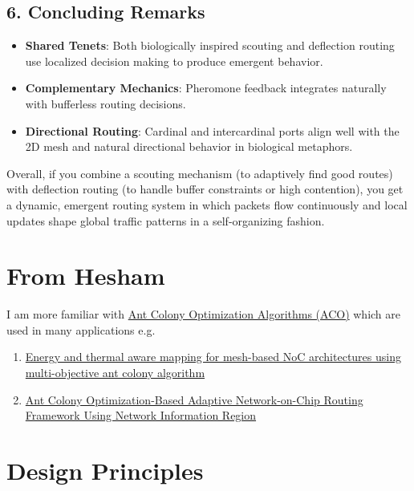 \documentclass[../OAE-SPEC-MAIN.tex]{subfiles}
\begin{document}
\subsection*{6. Concluding Remarks}

\begin{itemize}
    \item \textbf{Shared Tenets}: Both biologically inspired scouting and deflection routing use localized decision making to produce emergent behavior.
    \item \textbf{Complementary Mechanics}: Pheromone feedback integrates naturally with bufferless routing decisions.
    \item \textbf{Directional Routing}: Cardinal and intercardinal ports align well with the 2D mesh and natural directional behavior in biological metaphors.
\end{itemize}


Overall, if you combine a scouting mechanism (to adaptively find good routes) with deflection routing (to handle buffer constraints or high contention), you get a dynamic, emergent routing system in which packets flow continuously and local updates shape global traffic patterns in a self-organizing fashion.

\section{From Hesham}

I am more familiar with \href{https://ieeexplore.ieee.org/abstract/document/5764225}{Ant Colony Optimization Algorithms (ACO)} which are used in many applications e.g. 

\begin{enumerate}
\item  \href{https://ieeexplore.ieee.org/document/6945251}{Energy and thermal aware mapping for mesh-based NoC architectures using multi-objective ant colony algorithm}

\item  \href{ (https://ieeexplore.ieee.org/document/6945251)}{ Ant Colony Optimization-Based Adaptive Network-on-Chip Routing Framework Using Network Information Region}
\end{enumerate}






\newpage
\section{Design Principles}
\end{document}
